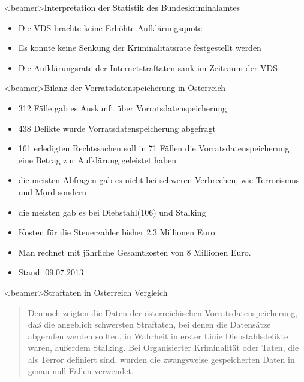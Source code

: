               \begin{frame}<beamer>{Interpretation der Statistik des Bundeskriminalamtes}
\begin{itemize}
        \item Die VDS brachte keine Erhöhte Aufklärungsquote
        \item Es konnte keine Senkung der Kriminalitätsrate festgestellt werden
        \item Die Aufklärungsrate der Internetstraftaten sank im Zeitraum der VDS
    \end{itemize}
    \end{frame}
       \begin{frame}<beamer>{Bilanz der Vorratsdatenspeicherung in Österreich}
        \begin{itemize}
        \item 312 Fälle gab es Auskunft über Vorratsdatenspeicherung
        \item 438 Delikte wurde Vorratsdatenspeicherung abgefragt
        \item 161 erledigten Rechtssachen soll in 71 Fällen die Vorratsdatenspeicherung eine Betrag zur Aufklärung geleistet haben
        \item die meisten Abfragen gab es nicht bei schweren Verbrechen, wie Terrorismus und Mord sondern
        \item die meisten gab es bei Diebstahl(106) und Stalking
        \item Kosten für die Steuerzahler bisher 2,3 Millionen Euro
        \item Man rechnet mit jährliche Gesamtkosten von 8 Millionen Euro.
        \item Stand: 09.07.2013 
         \end{itemize}
    \end{frame}
    \begin{frame}<beamer>{Straftaten in Osterreich Vergleich}
      \begin{quote}
        Dennoch zeigten die Daten der österreichischen Vorratsdatenspeicherung, daß die angeblich schwersten Straftaten, bei denen die Datensätze abgerufen werden sollten, in Wahrheit in erster Linie Diebstahlsdelikte waren, außerdem Stalking. Bei Organisierter Kriminalität oder Taten, die als Terror definiert sind, wurden die zwangsweise gespeicherten Daten in genau null Fällen verwendet.

      \end{quote}
    \end{frame}



